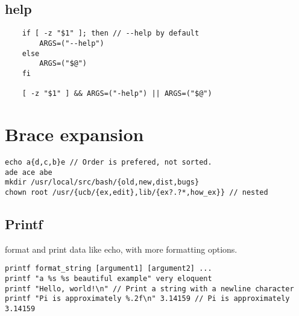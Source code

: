 \subsection{help}

\begin{verbatim}
    if [ -z "$1" ]; then // --help by default
        ARGS=("--help")
    else
        ARGS=("$@")
    fi

    [ -z "$1" ] && ARGS=("-help") || ARGS=("$@")
\end{verbatim}

\section{Brace expansion}

\begin{verbatim}
echo a{d,c,b}e // Order is prefered, not sorted.
ade ace abe
mkdir /usr/local/src/bash/{old,new,dist,bugs}
chown root /usr/{ucb/{ex,edit},lib/{ex?.?*,how_ex}} // nested
\end{verbatim}

\subsection{Printf}

format and print data like echo, with more formatting options.

\begin{verbatim}
printf format_string [argument1] [argument2] ...
printf "a %s %s beautiful example" very eloquent
printf "Hello, world!\n" // Print a string with a newline character
printf "Pi is approximately %.2f\n" 3.14159 // Pi is approximately 3.14159
\end{verbatim}
